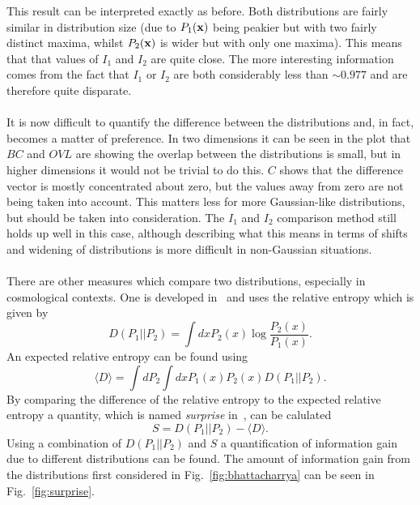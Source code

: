 \documentclass[twocolumn]{revtex4-1}
\begin{document}
    \noindent This result can be interpreted exactly as before.
    Both distributions are fairly similar in distribution size (due to $P_1({\bf x})$ being peakier but with two fairly distinct maxima, whilst $P_2({\bf x})$ is wider but with only one maxima).
    This means that that values of $I_1$ and $I_2$ are quite close.
    The more interesting information comes from the fact that $I_1$ or $I_2$ are both considerably less than $\sim0.977$ and are therefore quite disparate.
    \\
    \\
    It is now difficult to quantify the difference between the distributions and, in fact, becomes a matter of preference.
    In two dimensions it can be seen in the plot that $BC$ and $OVL$ are showing the overlap between the distributions is small, but in higher dimensions it would not be trivial to do this.
    $C$ shows that the difference vector is mostly concentrated about zero, but the values away from zero are not being taken into account.
    This matters less for more Gaussian-like distributions, but should be taken into consideration.
    The $I_1$ and $I_2$ comparison method still holds up well in this case, although describing what this means in terms of shifts and widening of distributions is more difficult in non-Gaussian situations.
    \\
    \\
    There are other measures which compare two distributions, especially in cosmological contexts.
    One is developed in~\cite{Seehars:2014ora} and uses the relative entropy which is given by
    \begin{equation}
        D(P_1||P_2) = \int dx P_2(x)\log\frac{P_2(x)}{P_1(x)}.
    \end{equation}
    An expected relative entropy can be found using
    \begin{equation}
        \langle D\rangle = \int dP_2\int dx P_1(x)P_2(x) D(P_1||P_2).
    \end{equation}
    By comparing the difference of the relative entropy to the expected relative entropy a quantity, which is named \emph{surprise} in~\cite{Seehars:2014ora}, can be calulated
    \begin{equation}
        S = D(P_1||P_2) - \langle D\rangle.
    \end{equation}
    Using a combination of $D(P_1||P_2)$ and $S$ a quantification of information gain due to different distributions can be found.
    The amount of information gain from the distributions first considered in Fig.~\ref{fig:bhattacharrya} can be seen in Fig.~\ref{fig:surprise}.
\end{document}
